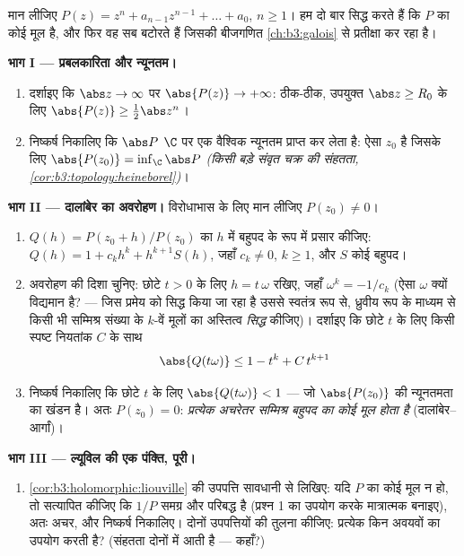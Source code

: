 \begin{problem}\label{pb:b3:holomorphic:1}
मान लीजिए $P(z) = z^n + a_{n-1}z^{n-1} + \dots + a_0$, $n \geq 1$। हम दो बार सिद्ध करते हैं कि $P$ का कोई
मूल है, और फिर वह सब बटोरते हैं जिसकी बीजगणित \cref{ch:b3:galois} से प्रतीक्षा
कर रहा है।

\medskip
\noindent\textbf{भाग I --- प्रबलकारिता और न्यूनतम।}
\begin{enumerate}
  \item दर्शाइए कि $\abs z \to
        \infty$ पर $\abs{P(z)} \to +\infty$: ठीक-ठीक, उपयुक्त $\abs z \geq R_0$ के लिए
        $\abs{P(z)} \geq \frac12\abs z^n$।
  \item निष्कर्ष निकालिए कि $\abs P$ $\C$ पर एक वैश्विक न्यूनतम
        प्राप्त कर लेता है: ऐसा $z_0$ है जिसके लिए $\abs{P(z_0)} = \inf_\C\abs P$
        \emph{(किसी बड़े संवृत चक्र की संहतता, \cref{cor:b3:topology:heineborel})}।
\end{enumerate}

\medskip
\noindent\textbf{भाग II --- दालांबेर का अवरोहण।} विरोधाभास के लिए
मान लीजिए $P(z_0) \neq 0$।
\begin{enumerate}[resume]
  \item $Q(h) = P(z_0 + h)/P(z_0)$ का $h$ में बहुपद के रूप में प्रसार कीजिए: $Q(h) = 1 + c_kh^k + h^{k+1}S(h)$,
        जहाँ $c_k \neq
        0$, $k \geq 1$, और $S$ कोई बहुपद।
  \item अवरोहण की दिशा चुनिए: छोटे $t > 0$ के लिए $h = t\,\omega$ रखिए, जहाँ
        $\omega^k = -1/c_k$ (ऐसा $\omega$ क्यों विद्यमान है? --- जिस प्रमेय को
        सिद्ध किया जा रहा है उससे स्वतंत्र रूप से, ध्रुवीय रूप के
        माध्यम से किसी भी सम्मिश्र संख्या के $k$-वें मूलों का
        अस्तित्व \emph{सिद्ध} कीजिए)। दर्शाइए कि छोटे $t$ के लिए
        किसी स्पष्ट नियतांक $C$ के साथ
        \[
        \abs{Q(t\omega)} \leq 1 - t^k + C\,t^{k+1}
        \]
  \item निष्कर्ष निकालिए कि छोटे $t$ के लिए $\abs{Q(t\omega)} < 1$ --- जो $\abs{P(z_0)}$
        की न्यूनतमता का खंडन है। अतः $P(z_0) = 0$: \emph{प्रत्येक अचरेतर
        सम्मिश्र बहुपद का कोई मूल होता है} (दालांबेर--आर्गां)।
\end{enumerate}

\medskip
\noindent\textbf{भाग III --- ल्यूविल की एक पंक्ति, पूरी।}
\begin{enumerate}[resume]
  \item \cref{cor:b3:holomorphic:liouville} की उपपत्ति सावधानी से लिखिए: यदि $P$ का कोई मूल न
        हो, तो सत्यापित कीजिए कि $1/P$ समग्र और परिबद्ध है
        (प्रश्न 1 का उपयोग करके मात्रात्मक बनाइए), अतः अचर, और
        निष्कर्ष निकालिए। दोनों उपपत्तियों की तुलना कीजिए:
        प्रत्येक किन अवयवों का उपयोग करती है? (संहतता दोनों में
        आती है --- कहाँ?)
\end{enumerate}


\end{problem}
